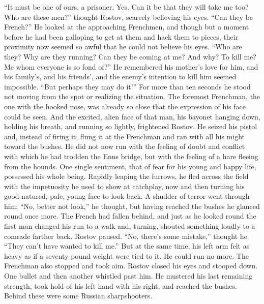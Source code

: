 ``It must be one of ours, a prisoner. Yes. Can it be that they
will take me too? Who are these men?'' thought Rostov, scarcely
believing his eyes.  ``Can they be French?'' He looked at the
approaching Frenchmen, and though but a moment before he had been
galloping to get at them and hack them to pieces, their proximity
now seemed so awful that he could not believe his eyes. ``Who are
they? Why are they running? Can they be coming at me?  And why?
To kill me? Me whom everyone is so fond of?'' He remembered his
mother's love for him, and his family's, and his friends', and
the enemy's intention to kill him seemed impossible. ``But
perhaps they may do it!'' For more than ten seconds he stood not
moving from the spot or realizing the situation. The foremost
Frenchman, the one with the hooked nose, was already so close
that the expression of his face could be seen. And the excited,
alien face of that man, his bayonet hanging down, holding his
breath, and running so lightly, frightened Rostov. He seized his
pistol and, instead of firing it, flung it at the Frenchman and
ran with all his might toward the bushes. He did not now run with
the feeling of doubt and conflict with which he had trodden the
Enns bridge, but with the feeling of a hare fleeing from the
hounds. One single sentiment, that of fear for his young and
happy life, possessed his whole being. Rapidly leaping the
furrows, he fled across the field with the impetuosity he used to
show at catchplay, now and then turning his good-natured, pale,
young face to look back. A shudder of terror went through him:
``No, better not look,'' he thought, but having reached the
bushes he glanced round once more. The French had fallen behind,
and just as he looked round the first man changed his run to a
walk and, turning, shouted something loudly to a comrade farther
back. Rostov paused. ``No, there's some mistake,'' thought
he. ``They can't have wanted to kill me.'' But at the same time,
his left arm felt as heavy as if a seventy-pound weight were tied
to it. He could run no more. The Frenchman also stopped and took
aim. Rostov closed his eyes and stooped down. One bullet and then
another whistled past him. He mustered his last remaining
strength, took hold of his left hand with his right, and reached
the bushes. Behind these were some Russian sharpshooters.


